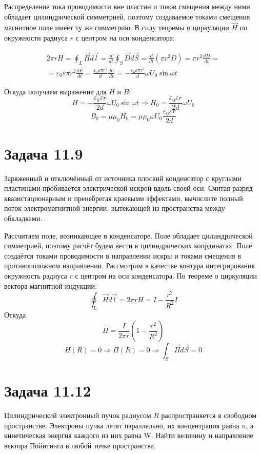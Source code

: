 \documentclass[11pt]{article}
\begin{document}
Распределение тока проводимости вне пластин и токов смещения между ними обладает цилиндрической симметрией, поэтому
создаваемое токами смещения магнитное поле имеет ту же симметрию. В силу теоремы о циркуляции \(\vec H\) по окружности
радиуса \(r\) с центром на оси конденсатора:
\begin{LATEX}
\begin{multline*}
2\pi rH = \oint_L\vec Hd\vec l = \frac{d}{dt}\oint_S\vec Dd\vec S = \frac{d}{dt}(\pi r^2D) = \pi r^2\frac{dD}{dt} = \\
= \varepsilon_0\varepsilon\pi r^2\frac{dE}{dt} = \frac{\varepsilon_0\varepsilon\pi r^2}{d}\frac{dU}{dt}
= -\frac{\varepsilon_0\varepsilon\pi r^2}{d}\omega U_0\sin \omega t
\end{multline*}
\end{LATEX}
Откуда получаем выражение для \(H\) и \(B\):
$$H = -\frac{\varepsilon_0\varepsilon r}{2d}\omega U_0\sin\omega t \Rightarrow H_0 = \frac{\varepsilon_0\varepsilon r}{2d}\omega U_0$$
$$B_0 = \mu\mu_0 H_0 = \mu\mu_0\omega U_0\frac{\varepsilon_0\varepsilon r}{2d}$$
\section{Задача 11.9}
\label{sec:org9b7c092}
Заряженный и отключённый от источника плоский конденсатор с круглыми пластинами пробивается электрической искрой
вдоль своей оси. Считая разряд квазистационарным и пренебрегая краевыми эффектами, вычислите полный поток электромагнитной
энергии, вытекающей из пространства между обкладками.

Рассчитаем поле, возникающее в конденсаторе. Поле обладает цилиндрической симметрией, поэтому расчёт будем вести в
цилиндрических координатах. Поле создаётся токами проводимости в направлении искры и токами смещения в противоположном
направлении. Рассмотрим в качестве контура интегрирования окружность радиуса \(r\) с центром на оси конденсатора. По
теореме о циркуляции вектора магнитной индукции:
$$\oint_L\vec Hd\vec l = 2\pi rH = I - \frac{r^2}{R^2}I$$
Откуда
$$H = \frac{I}{2\pi r}\left(1 - \frac{r^2}{R^2}\right)$$
$$H(R) = 0 \Rightarrow \Pi(R) = 0 \Rightarrow \int_S\vec\Pi d\vec S = 0$$
\section{Задача 11.12}
\label{sec:org58a87b1}
Цилиндрический электронный пучок радиусом \(R\) распространяется в свободном пространстве. Электроны пучка летят
параллельно, их концентрация равна \(n\), а кинетическая энергия каждого из них равна W. Найти величину и направление
вектора Пойнтинга в любой точке пространства.
\end{document}
